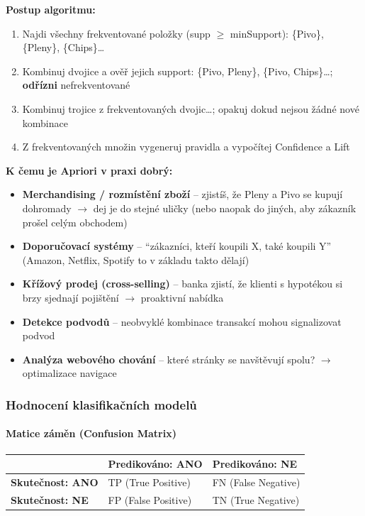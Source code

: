 \textbf{Postup algoritmu:}
\begin{enumerate}
  \item Najdi všechny frekventované položky (supp $\geq$ minSupport): \{Pivo\}, \{Pleny\}, \{Chips\}\ldots
  \item Kombinuj dvojice a ověř jejich support: \{Pivo, Pleny\}, \{Pivo, Chips\}\ldots; \textbf{odřízni} nefrekventované
  \item Kombinuj trojice z frekventovaných dvojic\ldots; opakuj dokud nejsou žádné nové kombinace
  \item Z frekventovaných množin vygeneruj pravidla a vypočítej Confidence a Lift
\end{enumerate}

\textbf{K čemu je Apriori v praxi dobrý:}
\begin{itemize}
  \item \textbf{Merchandising / rozmístění zboží} -- zjistíš, že Pleny a Pivo se kupují dohromady
    $\to$ dej je do stejné uličky (nebo naopak do jiných, aby zákazník prošel celým obchodem)
  \item \textbf{Doporučovací systémy} -- ``zákazníci, kteří koupili X, také koupili Y''
    (Amazon, Netflix, Spotify to v základu takto dělají)
  \item \textbf{Křížový prodej (cross-selling)} -- banka zjistí, že klienti s hypotékou si brzy sjednají pojištění $\to$ proaktivní nabídka
  \item \textbf{Detekce podvodů} -- neobvyklé kombinace transakcí mohou signalizovat podvod
  \item \textbf{Analýza webového chování} -- které stránky se navštěvují spolu? $\to$ optimalizace navigace
\end{itemize}

\subsubsection{Hodnocení klasifikačních modelů}

\paragraph{Matice záměn (Confusion Matrix)}

\begin{center}
\begin{tabular}{lll}
\toprule
 & \textbf{Predikováno: ANO} & \textbf{Predikováno: NE} \\
\midrule
\textbf{Skutečnost: ANO} & TP (True Positive) & FN (False Negative) \\
\textbf{Skutečnost: NE}  & FP (False Positive) & TN (True Negative) \\
\bottomrule
\end{tabular}
\end{center}

